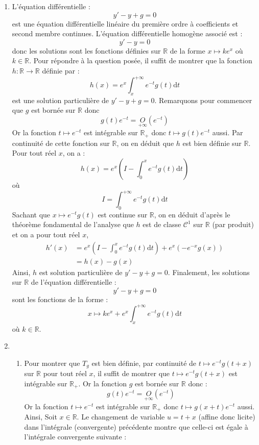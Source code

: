 \documentclass[twoside,french,11pt]{VcCours}
\newcommand{\enc}[1]{\fbox{#1}}
\newcommand{\dt}{\text{d}t}
\begin{document}
\begin{enumerate}
\begin{enumerate}
  \end{enumerate}
  \item L'équation différentielle :
  $$  y'-y+g=0$$
  est une équation différentielle linéaire du première ordre à coefficients et second membre continues. L'équation différentielle homogène associé est :
  $$ y'-y=0$$
  donc les solutions sont les fonctions définies sur $\mathbb{R}$ de la forme $x \mapsto ke^x$ où $k \in \mathbb{R}$. Pour répondre à la question posée, il suffit de montrer que la fonction $h : \mathbb{R} \rightarrow \mathbb{R}$ définie par :
  $$ h(x) = e^x \int_x^{+ \infty} e^{-t} g(t) \dt$$
  est une solution particulière de $y'-y+g=0$. Remarquons pour commencer que $g$ est bornée sur $\mathbb{R}$ donc 
  $$ g(t) e^{-t} =\underset{+ \infty} O(e^{-t})$$
  Or la fonction $t \mapsto e^{-t}$ est intégrable sur $\mathbb{R}_+$ donc $t \mapsto g(t) e^{-t}$ aussi. Par continuité de cette fonction sur $\mathbb{R}$, on en déduit que $h$ est bien définie sur $\mathbb{R}$. Pour tout réel $x$, on a :
  $$ h(x) = e^x \left( I - \int_0^x  e^{-t} g(t) \dt \right)$$
  où 
  $$ I = \int_0^{+ \infty}  e^{-t} g(t) \dt $$
  Sachant que $x \mapsto e^{-t} g(t)$ est continue sur $\mathbb{R}$, on en déduit d'après le théorème fondamental de l'analyse que $h$ est de classe $\mathcal{C}^1$ sur $\mathbb{R}$ (par produit) et on a pour tout réel $x$,
  \begin{align*}
  h'(x) &= e^x  \left( I - \int_0^x  e^{-t} g(t) \dt \right) + e^x (-e^{-x}g(x)) \\
  & = h(x) - g(x)
  \end{align*}
  Ainsi, $h$ est solution particulière de $y'-y+g=0$. Finalement,  les solutions sur $\mathbb{R}$ de l'équation différentielle :
  $$ y'-y+g=0$$
  sont les fonctions de la forme :
  $$ \boxed{x \mapsto k e^x + e^x \int_x^{+ \infty} e^{-t} g(t) \dt}$$
  où $k \in \mathbb{R}$.
  \item 
  \begin{enumerate}
  \item Pour montrer que $T_g$ est bien définie, par continuité de $t \mapsto e^{-t} g(t+x)$ sur $\mathbb{R}$ pour tout réel $x$, il suffit de montrer que $t \mapsto e^{-t} g(t+x)$ est intégrable sur $\mathbb{R}_+$. Or la fonction $g$ est bornée sur $\mathbb{R}$ donc :
  $$ g(t) e^{-t} =\underset{+ \infty} O(e^{-t})$$
  Or la fonction $t \mapsto e^{-t}$ est intégrable sur $\mathbb{R}_+$ donc $t \mapsto g(x+t) e^{-t}$ aussi. Ainsi,
  \enc{$T_g$ est bien définie}
  Soit $x \in \mathbb{R}$. Le changement de variable $u=t+x$ (affine donc licite) dans l'intégrale (convergente) précédente montre que celle-ci est égale à l'intégrale convergente suivante : 

\end{enumerate}
\end{enumerate}
\end{document}

